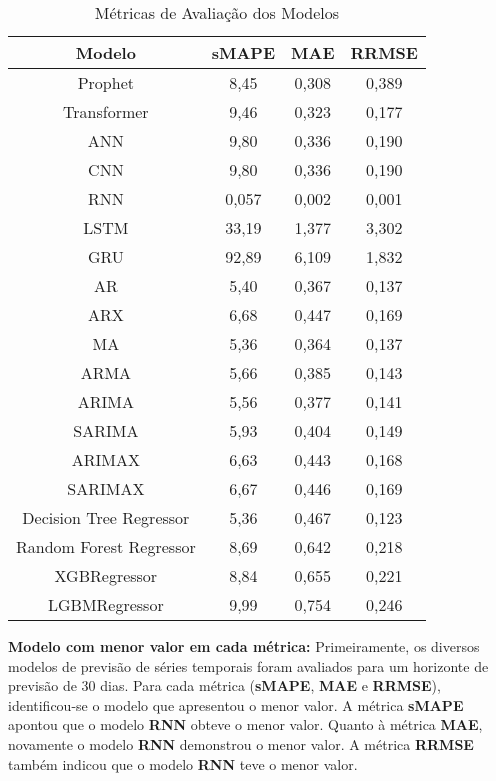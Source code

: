 \begin{table}[!htb]
	\centering
	\caption{Métricas de Avaliação dos Modelos}
	\label{tab:metrics}
	\small
	
	\begin{tabular}{cccc}
		\hline
		
		\textbf{Modelo} & \textbf{sMAPE} & \textbf{MAE} & \textbf{RRMSE} \\
		\hline
		Prophet & 8,45 & 0,308 & 0,389 \\
		Transformer & 9,46 & 0,323 & 0,177 \\
		ANN & 9,80 & 0,336 & 0,190 \\
		CNN & 9,80 & 0,336 & 0,190 \\
		RNN & 0,057 & 0,002 & 0,001 \\
		LSTM & 33,19 & 1,377 & 3,302 \\
		GRU & 92,89 & 6,109 & 1,832 \\
		AR & 5,40 & 0,367 & 0,137 \\
		ARX & 6,68 & 0,447 & 0,169 \\
		MA & 5,36 & 0,364 & 0,137 \\
		ARMA & 5,66 & 0,385 & 0,143 \\
		ARIMA & 5,56 & 0,377 & 0,141 \\
		SARIMA & 5,93 & 0,404 & 0,149 \\
		ARIMAX & 6,63 & 0,443 & 0,168 \\
		SARIMAX & 6,67 & 0,446 & 0,169 \\
		Decision Tree Regressor & 5,36 & 0,467 & 0,123 \\
		Random Forest Regressor & 8,69 & 0,642 & 0,218 \\
		XGBRegressor & 8,84 & 0,655 & 0,221 \\
		LGBMRegressor & 9,99 & 0,754 & 0,246 \\
		\hline
	\end{tabular}
	
\end{table}




\noindent\textbf{Modelo com menor valor em cada métrica:}	
Primeiramente, os diversos modelos de previsão de séries temporais foram avaliados para um horizonte de previsão de 30 dias. Para cada métrica (\textbf{sMAPE}, \textbf{MAE} e \textbf{RRMSE}), identificou-se o modelo que apresentou o menor valor.
A métrica \textbf{sMAPE} apontou que o modelo \textbf{RNN} obteve o menor valor.
Quanto à métrica \textbf{MAE}, novamente o modelo \textbf{RNN} demonstrou o menor valor.
A métrica \textbf{RRMSE} também indicou que o modelo \textbf{RNN} teve o menor valor.


